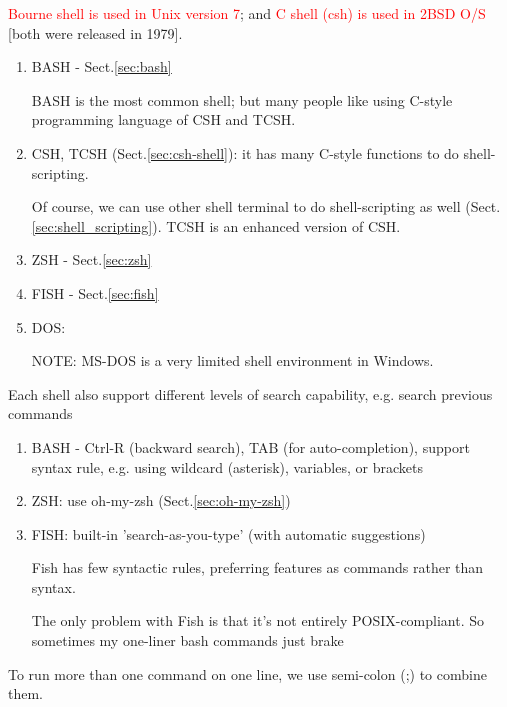 \textcolor{red}{Bourne shell is used in Unix version 7}; and \textcolor{red}{C
shell (csh) is used in 2BSD O/S} [both were released in 1979].

\begin{enumerate}
  \item BASH - Sect.\ref{sec:bash}

BASH is the most common shell; but many people like using C-style programming
language of CSH and TCSH.

  \item CSH, TCSH (Sect.\ref{sec:csh-shell}): it has many C-style functions to
  do shell-scripting.
  
Of course, we can use other shell terminal to do shell-scripting as well
(Sect.\ref{sec:shell_scripting}). TCSH is an enhanced version of CSH.

  \item ZSH - Sect.\ref{sec:zsh}
  
  \item FISH - Sect.\ref{sec:fish}
  
  \item DOS:

NOTE: MS-DOS is a very limited shell environment in Windows.

\end{enumerate}

Each shell also support different levels of search capability, e.g. search
previous commands
\begin{enumerate}
  \item BASH - Ctrl-R (backward search), TAB (for auto-completion), support
  syntax rule, e.g. using wildcard (asterisk), variables, or brackets
  
  
  \item ZSH: use oh-my-zsh (Sect.\ref{sec:oh-my-zsh})
  
 
  
  \item FISH: built-in 'search-as-you-type' (with automatic suggestions)
  
Fish has few syntactic rules, preferring features as commands rather than syntax. 

The only problem with Fish is that it's not entirely POSIX-compliant. So
sometimes my one-liner bash commands just brake

\end{enumerate}

To run more than one command on one line, we use semi-colon (;) to combine them.

